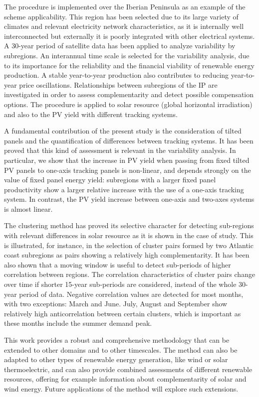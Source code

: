 The procedure is implemented over the Iberian Peninsula as an example of the scheme applicability. This region has been selected due to its large variety of climates and relevant electricity network characteristics, as it is internally well interconnected but externally it is poorly integrated with other electrical systems. A 30-year period of satellite data has been applied to analyze variability by subregions. An interannual time scale is selected for the variability analysis, due to its importance for the reliability and the financial viability of renewable energy production. A stable year-to-year production also contributes to reducing year-to-year price oscillations. Relationships between subregions of the IP are investigated in order to assess complementarity and detect possible compensation options. The procedure is applied to solar resource (global horizontal irradiation) and also to the PV yield with different tracking systems.

A fundamental contribution of the present study is the consideration of tilted panels and the quantification of differences between tracking systems. It has been proved that this kind of assessment is relevant in the variability analysis. In particular, we show that the increase in PV yield when passing from fixed tilted PV panels to one-axis tracking panels is non-linear, and depends strongly on the value of fixed panel energy yield: subregions with a larger fixed panel productivity show a larger relative increase with the use of a one-axis tracking system. In contrast, the PV yield increase between one-axis and two-axes systems is almost linear.

The clustering method has proved its selective character for detecting sub-regions with relevant differences in solar resource as it is shown in the case of study. This is illustrated, for instance, in the selection of cluster pairs formed by two Atlantic coast subregions as pairs showing a relatively high complementarity. It has been also shown that a moving window is useful to detect sub-periods of higher correlation between regions. The correlation characteristics of cluster pairs change over time if shorter 15-year sub-periods are considered, instead of the whole 30-year period of data. Negative correlation values are detected for most months, with two exceptions: March and June. July, August and September show relatively high anticorrelation between certain clusters, which is important as these months include the summer demand peak. 

This work provides a robust and comprehensive methodology that can be extended to other domains and to other timescales. The method can also be adapted to other types of renewable energy generation, like wind or solar thermoelectric, and can also provide combined assessments of different renewable resources, offering for example information about complementarity of solar and wind energy. Future applications of the method will explore such extensions.

